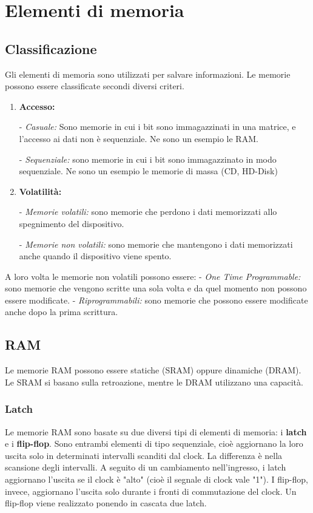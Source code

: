 \documentclass[\main/main.tex]{subfiles}
\begin{document}
\section{Elementi di memoria}
\subsection{Classificazione}
Gli elementi di memoria sono utilizzati per salvare informazioni.
Le memorie possono essere classificate secondi diversi criteri.
\begin{enumerate}
  \item \textbf{Accesso:}

        - \textit{Casuale:} Sono memorie in cui i bit sono immagazzinati in una matrice, e l'accesso ai dati non è sequenziale. Ne sono un esempio le RAM.

        - \textit{Sequenziale:} sono memorie in cui i bit sono immagazzinato in modo sequenziale. Ne sono un esempio le memorie di massa (CD, HD-Disk)
  \item \textbf{Volatilità:}

        - \textit{Memorie volatili:} sono memorie che perdono i dati memorizzati allo spegnimento del dispositivo.

        - \textit{Memorie non volatili:} sono memorie che mantengono i dati memorizzati anche quando il dispositivo viene spento.
\end{enumerate}

A loro volta le memorie non volatili possono essere:
- \textit{One Time Programmable:} sono memorie che vengono scritte una sola volta e da quel momento non possono essere modificate.
- \textit{Riprogrammabili:} sono memorie che possono essere modificate anche dopo la prima scrittura.

\subsection{RAM}
Le memorie RAM possono essere statiche (SRAM) oppure dinamiche (DRAM). Le SRAM si basano sulla retroazione, mentre le DRAM utilizzano una capacità.

\subsubsection{Latch}
Le memorie RAM sono basate su due diversi tipi di elementi di memoria: i \textbf{latch} e i \textbf{flip-flop}.
Sono entrambi elementi di tipo sequenziale, cioè aggiornano la loro uscita solo in determinati intervalli scanditi dal clock. La differenza è nella scansione degli intervalli.
A seguito di un cambiamento nell'ingresso, i latch aggiornano l'uscita se il clock è "alto" (cioè il segnale di clock vale "1").
I flip-flop, invece, aggiornano l'uscita solo durante i fronti di commutazione del clock.
Un flip-flop viene realizzato ponendo in cascata due latch.
\end{document}
